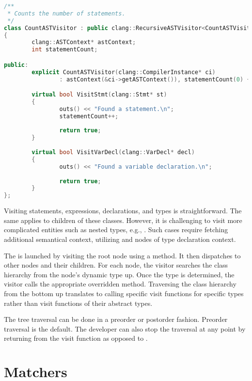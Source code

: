 \begin{lstlisting}[caption=CountASTVisitor, language=C++, 
label={lst:countvisitor}]
/**
 * Counts the number of statements.
 */
class CountASTVisitor : public clang::RecursiveASTVisitor<CountASTVisitor>
{
        clang::ASTContext* astContext;
        int statementCount;

public:
        explicit CountASTVisitor(clang::CompilerInstance* ci)
                : astContext(&ci->getASTContext()), statementCount(0) { }

        virtual bool VisitStmt(clang::Stmt* st)
        {
                outs() << "Found a statement.\n";
				statementCount++;
				
                return true;
        }
		
		virtual bool VisitVarDecl(clang::VarDecl* decl)
        {
                outs() << "Found a variable declaration.\n";
				
                return true;
        }
};
\end{lstlisting}

Visiting statements, expressions, declarations, 
and types is straightforward. 
The same applies to children of these classes. 
However, it is challenging to visit more complicated entities 
such as nested types, e.g., . 
Such cases require fetching additional semantical context, 
utilizing  and nodes of type declaration context.


The  is launched by visiting the root node using 
a  method. 
It then dispatches to other nodes and their children. 
For each node, the visitor searches the class hierarchy from 
the node's dynamic type up. 
Once the type is determined, the visitor calls the appropriate 
overridden  method. 
Traversing the class hierarchy from the bottom up 
translates to calling specific visit functions for specific types 
rather than visit functions of their abstract types.

The tree traversal can be done in a preorder or postorder fashion. 
Preorder traversal is the default. The developer can also stop
the traversal at any point by returning  from
the visit function as opposed to .

\section{Matchers}

